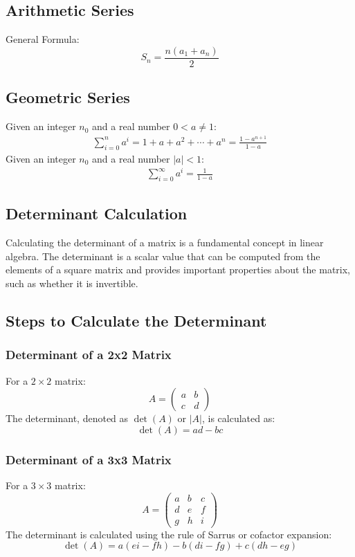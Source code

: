 \subsection{Arithmetic Series}
General Formula: \[
S_n=\frac{n(a_1 + a_n)}{2}
\]

\subsection{Geometric Series}
Given an integer $n_0$ and a real number $0<a \neq 1$:
\begin{align*}
    \sum_{i=0}^n a^{i} = 1 + a + a^2 + \cdots +a^n = \frac{1-a^{n+1}}{1-a} \label{GEOSeries}
\end{align*}
Given an integer $n_0$ and a real number $|a|<1$:
\begin{align*}
    \sum_{i=0}^\infty a^{i} = \frac{1}{1-a}
\end{align*}

\subsection{Determinant Calculation} \label{Determinant Calculation }

Calculating the determinant of a matrix is a fundamental concept in linear algebra. The determinant is a scalar value that can be computed from the elements of a square matrix and provides important properties about the matrix, such as whether it is invertible.

\subsection*{Steps to Calculate the Determinant}

\subsubsection*{Determinant of a 2x2 Matrix}
For a $2 \times 2$ matrix:
\[
A = \begin{pmatrix}
a & b \\
c & d
\end{pmatrix}
\]
The determinant, denoted as $\det(A)$ or $|A|$, is calculated as:
\[
\det(A) = ad - bc
\]

\subsubsection*{Determinant of a 3x3 Matrix}
For a $3 \times 3$ matrix:
\[
A = \begin{pmatrix}
a & b & c \\
d & e & f \\
g & h & i
\end{pmatrix}
\]
The determinant is calculated using the rule of Sarrus or cofactor expansion:
\[
\det(A) = a(ei - fh) - b(di - fg) + c(dh - eg)
\]


